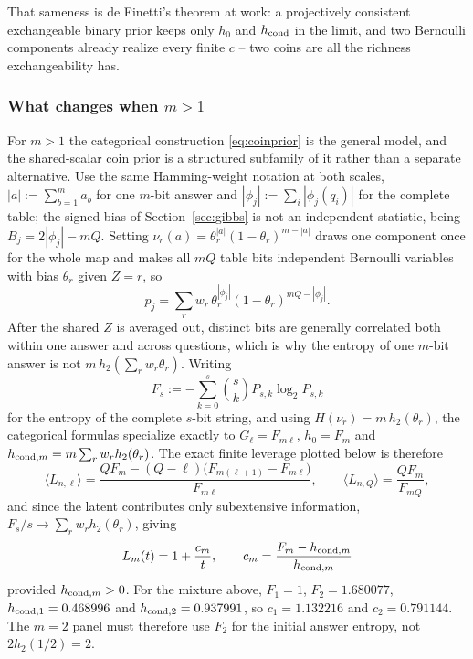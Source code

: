 That sameness is de Finetti's theorem at work: a projectively
consistent exchangeable binary prior keeps only $h_0$ and
$h_{\rm cond}$ in the limit, and two Bernoulli components already
realize every finite $c$ -- two coins are all the richness
exchangeability has.

\subsubsection{What changes when \texorpdfstring{$m>1$}{m>1}}

For $m > 1$ the categorical construction \eqref{eq:coinprior} is the
general model, and the shared-scalar coin prior is a structured
subfamily of it rather than a separate alternative. Use the same
Hamming-weight notation at both scales,
$|a| := \sum_{b=1}^m a_b$ for one $m$-bit answer and
$|\phi_j| := \sum_i |\phi_j(q_i)|$ for the complete table; the signed
bias of Section~\ref{sec:gibbs} is not an independent statistic, being
$B_j = 2|\phi_j| - mQ$. Setting
$\nu_r(a) = \theta_r^{|a|}(1-\theta_r)^{m-|a|}$ draws one component
once for the whole map and makes all $mQ$ table bits independent
Bernoulli variables with bias $\theta_r$ given $Z = r$, so
%
\begin{equation}
  p_j = \sum_r w_r\,\theta_r^{|\phi_j|}(1-\theta_r)^{mQ-|\phi_j|}.
  \label{eq:coinpriorm}
\end{equation}
%
After the shared $Z$ is averaged out, distinct bits are generally
correlated both within one answer and across questions, which is why
the entropy of one $m$-bit answer is not $m\,h_2(\sum_r w_r\theta_r)$.
Writing
%
\begin{equation}
  F_s := -\sum_{k=0}^s\binom sk P_{s,k}\log_2 P_{s,k}
  \label{eq:Fs}
\end{equation}
%
for the entropy of the complete $s$-bit string, and using
$H(\nu_r) = m\,h_2(\theta_r)$, the categorical formulas specialize
exactly to $G_\ell = F_{m\ell}$, $h_0 = F_m$ and
$h_{{\rm cond},m} = m\sum_r w_r h_2(\theta_r)$. The exact finite
leverage plotted below is therefore
%
\begin{equation}
  \langle L_{n,\ell}\rangle
  = \frac{Q F_m - (Q-\ell)\big(F_{m(\ell+1)}-F_{m\ell}\big)}{F_{m\ell}},
  \qquad
  \langle L_{n,Q}\rangle = \frac{Q F_m}{F_{mQ}},
  \label{eq:coinlevm}
\end{equation}
%
and since the latent contributes only subextensive information,
$F_s/s \to \sum_r w_r h_2(\theta_r)$, giving
%
\begin{equation}
  L_m(t) = 1 + \frac{c_m}{t},
  \qquad
  c_m = \frac{F_m - h_{{\rm cond},m}}{h_{{\rm cond},m}} 
  \label{eq:coinhyperbolam}
\end{equation}
%
provided $h_{{\rm cond},m} > 0$. For the mixture above,
$F_1 = 1$, $F_2 = 1.680077$, $h_{{\rm cond},1} = 0.468996$ and
$h_{{\rm cond},2} = 0.937991$, so $c_1 = 1.132216$ and
$c_2 = 0.791144$. The $m = 2$ panel must therefore use $F_2$ for the
initial answer entropy, not $2h_2(1/2) = 2$.


